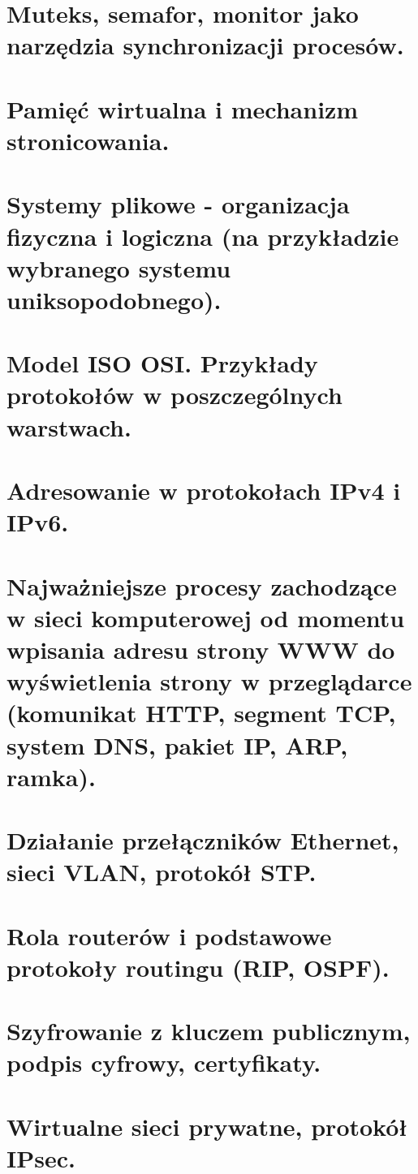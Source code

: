 \documentclass[12pt]{article}
\begin{document}
    \section{Muteks, semafor, monitor jako narzędzia synchronizacji procesów.}
    \section{Pamięć wirtualna i mechanizm stronicowania.}
    \section{Systemy plikowe - organizacja fizyczna i logiczna (na przykładzie wybranego systemu uniksopodobnego).}
    \section{Model ISO OSI. Przykłady protokołów w poszczególnych warstwach.}
    \section{Adresowanie w protokołach IPv4 i IPv6.}
    \section{Najważniejsze procesy zachodzące w sieci komputerowej od momentu wpisania adresu strony WWW do wyświetlenia strony w przeglądarce (komunikat HTTP, segment TCP, system DNS, pakiet IP, ARP, ramka).}
    \section{Działanie przełączników Ethernet, sieci VLAN, protokół STP.}
    \section{Rola routerów i podstawowe protokoły routingu (RIP, OSPF).}
    \section{Szyfrowanie z kluczem publicznym, podpis cyfrowy, certyfikaty.}
    \section{Wirtualne sieci prywatne, protokół IPsec.}
\end{document}
